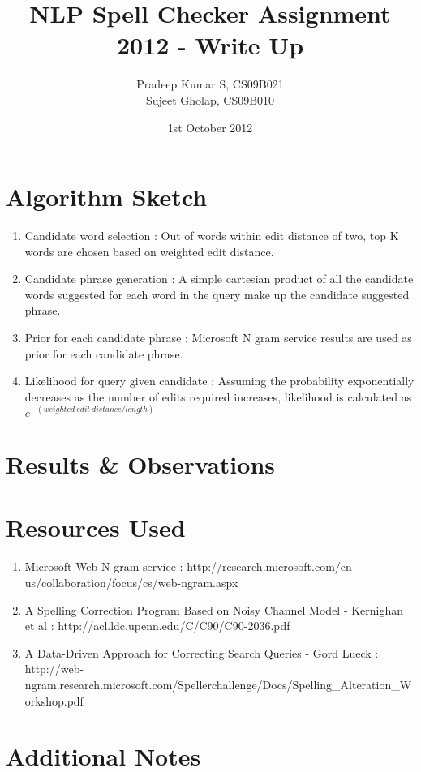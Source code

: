 \documentclass{article}
\title{NLP Spell Checker Assignment 2012 - Write Up}
\author{Pradeep Kumar S, CS09B021\\
Sujeet Gholap, CS09B010
}
\date{1st October 2012}
\begin{document}
\maketitle



\section{Algorithm Sketch}
\begin{enumerate}
\item Candidate word selection : Out of words within edit distance of two,
top K words are chosen based on weighted edit distance.
\item Candidate phrase generation : A simple cartesian product of all the
candidate words suggested for each word in the query make up the candidate
suggested phrase.
\item Prior for each candidate phrase : Microsoft N gram service results are
used as prior for each candidate phrase.
\item Likelihood for query given candidate : Assuming the probability
exponentially decreases as the number of edits required increases, likelihood
is calculated as $e^{-(weighted\ edit\ distance / length)}$
\end{enumerate}


\section{Results \& Observations}


\section{Resources Used}
\begin{enumerate}
\item Microsoft Web N-gram service : http://research.microsoft.com/en-us/collaboration/focus/cs/web-ngram.aspx
\item A Spelling Correction Program Based on Noisy Channel Model - Kernighan
et al : http://acl.ldc.upenn.edu/C/C90/C90-2036.pdf
\item A Data-Driven Approach for Correcting Search Queries - Gord Lueck :
http://web-ngram.research.microsoft.com/Spellerchallenge/Docs/Spelling\_Alteration\_Workshop.pdf
\end{enumerate}

\section{Additional Notes}
\end{document}
